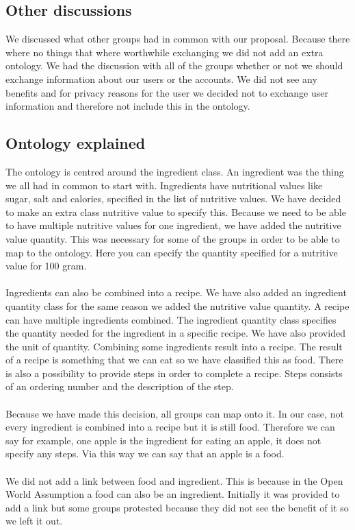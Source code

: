 \subsection{Other discussions}
We discussed what other groups had in common with our proposal. Because there where no things that where worthwhile exchanging we did not add an extra ontology.
\newline
\newline
\noindent
We had the discussion with all of the groups whether or not we should exchange information about our users or the accounts. We did not see any benefits and for privacy reasons for the user we decided not to exchange user information and therefore not include this in the ontology. 

\subsection{Ontology explained}
The ontology is centred around the ingredient class. An ingredient was the thing we all had in common to start with. Ingredients have nutritional values like sugar, salt and calories, specified in the list of nutritive values. We have decided to make an extra class nutritive value to specify this. Because we need to be able to have multiple nutritive values for one ingredient, we have added the nutritive value quantity. This was necessary for some of the groups in order to be able to map to the ontology. Here you can specify the quantity specified for a nutritive value for 100 gram.
\\ \\
Ingredients can also be combined into a recipe. We have also added an ingredient quantity class for the same reason we added the nutritive value quantity. A recipe can have multiple ingredients combined. The ingredient quantity class specifies the quantity needed for the ingredient in a specific recipe. We have also provided the unit of quantity. Combining some ingredients result into a recipe. The result of a recipe is something that we can eat so we have classified this as food. There is also a possibility to provide steps in order to complete a recipe. Steps consists of an ordering number and the description of the step. 
\\ \\
Because we have made this decision, all groups can map onto it. In our case, not every ingredient is combined into a recipe but it is still food. Therefore we can say for example, one apple is the ingredient for eating an apple, it does not specify any steps. Via this way we can say that an apple is a food.
\\ \\
We did not add a link between food and ingredient. This is because in the Open World Assumption a food can also be an ingredient. Initially it was provided to add a link but some groups protested because they did not see the benefit of it so we left it out. 

